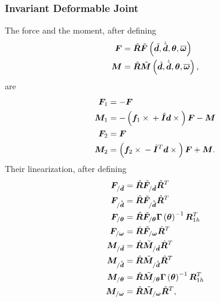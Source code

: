 \documentclass[10pt,fleqn,subeqn]{report}
\newcommand{\T}[1]{\bm{#1}}
\begin{document}
\subsubsection{Invariant Deformable Joint}
The force and the moment, after defining
\begin{subequations}
\begin{align}
	\T{F} &= \hat{\T{R}}
		\tilde{\T{F}}\plbr{
			\tilde{\T{d}},
			\dot{\tilde{\T{d}}},
			\T{\theta},
			\overline{\T{\omega}}
		} \\
	\T{M} &= \hat{\T{R}}
		\tilde{\T{M}}\plbr{
			\tilde{\T{d}},
			\dot{\tilde{\T{d}}},
			\T{\theta},
			\overline{\T{\omega}}
		} ,
\end{align}
\end{subequations}
are
\begin{subequations}
\begin{align}
	\T{F}_1 &= - \T{F} \\
	\T{M}_1 &= - \plbr{
		\T{f}_1 \times{}
		+ \hat{\T{I}} \T{d}\times{}
	} \T{F} - \T{M} \\
	\T{F}_2 &= \T{F} \\
	\T{M}_2 &= \plbr{
		\T{f}_2 \times{}
		- \hat{\T{I}}^T \T{d}\times{}
	} \T{F} + \T{M} .
\end{align}
\end{subequations}
Their linearization, after defining
\begin{subequations}
\begin{align}
	\T{F}_{/\tilde{\T{d}}} &=
		\hat{\T{R}} \tilde{\T{F}}_{/\tilde{\T{d}}} \hat{\T{R}}^T \\
	\T{F}_{/\dot{\tilde{\T{d}}}} &=
		\hat{\T{R}} \tilde{\T{F}}_{/\dot{\tilde{\T{d}}}} \hat{\T{R}}^T \\
	\T{F}_{/\T{\theta}}
		&= \hat{\T{R}} \tilde{\T{F}}_{/\T{\theta}} \T{\Gamma}\plbr{\T{\theta}}^{-1} \T{R}_{1h}^T \\
	\T{F}_{/\T{\omega}}
		&= \hat{\T{R}} \tilde{\T{F}}_{/\T{\omega}} \hat{\T{R}}^T \\
	\T{M}_{/\tilde{\T{d}}} &=
		\hat{\T{R}} \tilde{\T{M}}_{/\tilde{\T{d}}} \hat{\T{R}}^T \\
	\T{M}_{/\dot{\tilde{\T{d}}}} &=
		\hat{\T{R}} \tilde{\T{M}}_{/\dot{\tilde{\T{d}}}} \hat{\T{R}}^T \\
	\T{M}_{/\T{\theta}}
		&= \hat{\T{R}} \tilde{\T{M}}_{/\T{\theta}} \T{\Gamma}\plbr{\T{\theta}}^{-1} \T{R}_{1h}^T \\
	\T{M}_{/\T{\omega}}
		&= \hat{\T{R}} \tilde{\T{M}}_{/\T{\omega}} \hat{\T{R}}^T ,
\end{align}
\end{subequations}
\end{document}
